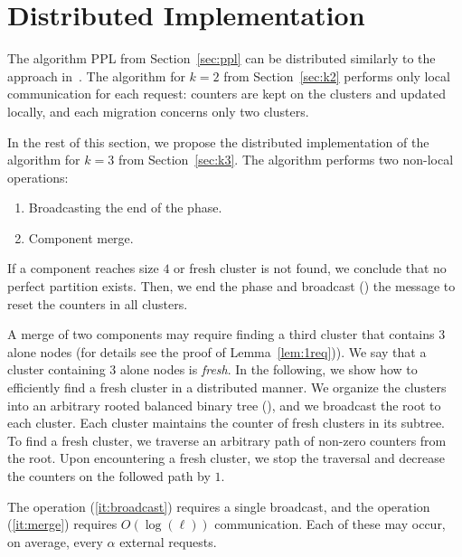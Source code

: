 \documentclass[manuscript,screen=true, review, anonymous]{acmart}
\newcommand\maciek[1]{}
\begin{document}
\section{Distributed Implementation}
The algorithm PPL from Section~\ref{sec:ppl} can be distributed
similarly to the approach in~\cite{sigmetrics19_partitioning}.
The algorithm for $k=2$ from Section~\ref{sec:k2} performs only local communication for each request: counters are kept on the clusters and updated locally, and each migration concerns only two clusters.
\medskip

In the rest of this section, we propose the distributed implementation of the algorithm for $k=3$ from Section~\ref{sec:k3}.
The algorithm performs two non-local operations:
\begin{enumerate}
	\item Broadcasting the end of the phase.\label{it:broadcast}
	\item Component merge.
	\label{it:merge}
\end{enumerate}

If a component reaches size $4$ or fresh cluster is not found, we conclude that no perfect partition exists.
Then, we end the phase and broadcast (\maciek{TODO: efficient broadcast cite}) the message to  reset the counters in all clusters.

A merge of two components may require finding a third cluster that contains $3$ alone nodes (for details see the proof of Lemma~\ref{lem:1req})).
We say that a cluster containing $3$ alone nodes is \emph{fresh}.
In the following, we show how to efficiently find a fresh cluster in a distributed manner.
We organize the clusters into an arbitrary rooted balanced binary tree (\maciek{TODO: how to do it efficiently? Does not matter much, as this is performed once at the beginning}), and we broadcast the root to each cluster.
Each cluster maintains the counter of fresh clusters in its subtree.
To find a fresh cluster, we traverse an arbitrary path of non-zero counters from the root.
Upon encountering a fresh cluster, we stop the traversal and decrease the counters on the followed path by $1$.

The operation (\ref{it:broadcast}) requires a single broadcast, and the operation (\ref{it:merge}) requires $O(\log(\ell))$ communication.
Each of these may occur, on average, every $\alpha$ external requests.



  

\appendix
\end{document}
